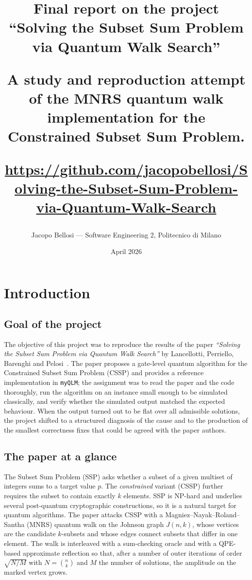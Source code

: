 \documentclass[11pt,a4paper]{article}
\title{\textbf{Final report on the project ``Solving the Subset Sum
Problem via Quantum Walk Search''}%

\large
A study and reproduction attempt of the MNRS quantum walk
implementation for the Constrained Subset Sum Problem.

\url{https://github.com/jacopobellosi/Solving-the-Subset-Sum-Problem-via-Quantum-Walk-Search}
}
\author{Jacopo Bellosi --- Software Engineering 2,
Politecnico di Milano}
\date{April 2026}
\begin{document}
\maketitle

\tableofcontents

\section{Introduction}
\label{sec:intro}

\subsection{Goal of the project}

The objective of this project was to reproduce the results
of the paper \emph{``Solving the Subset Sum Problem via Quantum
Walk Search''} by Lancellotti, Perriello, Barenghi and
Pelosi~\cite{lancellotti2026}. The paper
proposes a gate-level quantum algorithm for the Constrained
Subset Sum Problem (CSSP) and provides a reference implementation
in \texttt{myQLM}; the assignment was to read the paper and the code
thoroughly, run the algorithm on an instance small enough to be
simulated classically, and verify whether the simulated output
matched the expected behaviour. When the output turned out to be
flat over all admissible solutions, the project shifted to a
structured diagnosis of the cause and to the production of the
smallest correctness fixes that could be agreed with the paper
authors.

\subsection{The paper at a glance}


The Subset Sum Problem (SSP) asks whether a subset of a given
multiset of integers sums to a target value $p$. The
\emph{constrained} variant (CSSP) further requires the subset to
contain exactly $k$ elements. SSP is NP-hard and underlies
several post-quantum cryptographic constructions, so it is a
natural target for quantum algorithms. The paper attacks CSSP
with a Magniez--Nayak--Roland--Santha (MNRS) quantum walk on the Johnson graph $J(n,k)$, whose
vertices are the candidate $k$-subsets and whose edges connect
subsets that differ in one element. The walk is interleaved with
a sum-checking oracle and with a QPE-based approximate
reflection so that, after a number of outer iterations of order
$\sqrt{N/M}$ with $N=\binom{n}{k}$ and $M$ the number of
solutions, the amplitude on the marked vertex grows.
\end{document}
